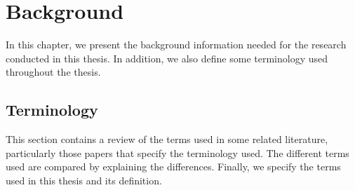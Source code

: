 \chapter{Background}\label{ch:Background}
In this chapter, we present the background information needed for the research conducted in this thesis. In addition, we also define some terminology used throughout the thesis.

\section{Terminology}
This section contains a review of the terms used in some related literature, particularly those papers that specify the terminology used. The different terms used are compared by explaining the differences. Finally, we specify the terms used in this thesis and its definition.

